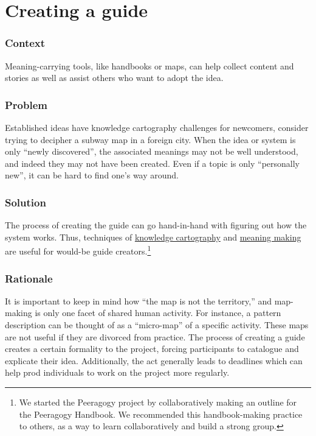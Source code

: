 \section{Creating a guide}\label{sec:Creating_a_guide}
\subsubsection*{Context} Meaning-carrying tools, like handbooks or maps, can help collect content and stories as well as assist others who want to adopt the idea.

\subsubsection*{Problem} 
Established ideas have knowledge cartography challenges for newcomers, consider trying to decipher a subway map in a foreign city. When the idea or system is only ``newly discovered'', the associated meanings may not be well understood, and indeed they may not have been created. Even if a topic is only ``personally new'', it can be hard to find one's way around.

\subsubsection*{Solution}
The process of creating the guide can go hand-in-hand with figuring out how the system works. Thus, techniques of \href{http://knowledgecartography.org/}{knowledge cartography} and \href{http://www.hitl.washington.edu/publications/r-97-47/two.html}{meaning making} are useful for would-be guide creators.\footnote{We started the Peeragogy project by collaboratively making an outline for the Peeragogy Handbook. We recommended this
handbook-making practice to others, as a way to learn collaboratively and build a strong group.}

\subsubsection*{Rationale} 
It is important to keep in mind how ``the map is not the territory,'' and map-making is only one facet of shared human activity. For instance, a pattern description can be thought of as a ``micro-map'' of a specific activity. These maps are not useful if they are divorced from practice. The process of creating a guide creates a certain formality to the project, forcing participants to catalogue and explicate their idea. Additionally, the act generally leads to deadlines which can help prod individuals to work on the project more regularly.

